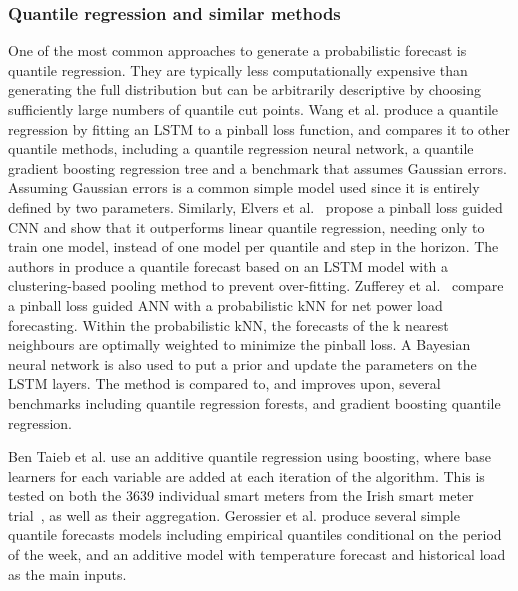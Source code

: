 \subsubsection{Quantile regression and similar methods}
One of the most common approaches to generate a probabilistic forecast is quantile regression. They are typically less computationally expensive than generating the full distribution but can be arbitrarily descriptive by choosing sufficiently large numbers of quantile cut points. Wang et al. \cite{wang2019pil} produce a quantile regression by fitting an LSTM to a pinball loss function, and compares it to other quantile methods, including a quantile regression neural network, a quantile gradient boosting regression tree and a benchmark that assumes Gaussian errors. Assuming Gaussian errors is a common simple model used since it is entirely defined by two parameters. Similarly, Elvers et al.~\cite{Elvers2019spl} propose a pinball loss guided CNN and show that it outperforms linear quantile regression, needing only to train one model, instead of one model per quantile and step in the horizon. The authors in \cite{yang2020bdl} produce a quantile forecast based on an LSTM model with a clustering-based pooling method to prevent over-fitting.  Zufferey et al.~\cite{zufferey2020psf} compare a pinball loss guided ANN with a probabilistic kNN for net power load forecasting. Within the probabilistic kNN, the forecasts of the k nearest neighbours are optimally weighted to minimize the pinball loss. A Bayesian neural network is also used to put a prior and update the parameters on the LSTM layers. The method is compared to, and improves upon, several benchmarks including quantile regression forests, and gradient boosting quantile regression. 

Ben Taieb et al. \cite{taieb2016fui} use an additive quantile regression using boosting, where base learners for each variable are added at each iteration of the algorithm. This is tested on both the 3639 individual smart meters from the Irish smart meter trial~\cite{Commission2012csm}, as well as their aggregation. Gerossier et al. \cite{gerossier2018rda} produce several simple quantile forecasts models including empirical quantiles conditional on the period of the week, and an additive model with temperature forecast and historical load as the main inputs. 

